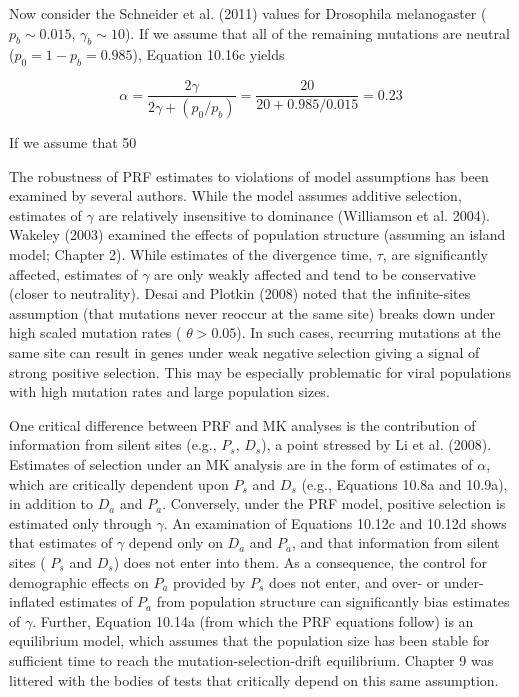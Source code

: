 \documentclass{article}
\begin{document}
Now consider the Schneider et al. (2011) values for Drosophila melanogaster ($p_b \sim 0.015$, $\gamma_b \sim 10$). If we assume that all of the remaining mutations are neutral ($p_0 = 1 - p_b = 0.985$), Equation 10.16c yields

\begin{equation}
\alpha=\frac{2\gamma}{2\gamma+\left(p_{0}/p_{b}\right)}=\frac{20}{20+0.985/0.015}=0.23
\end{equation}

If we assume that 50%

The robustness of PRF estimates to violations of model assumptions has been examined by several authors. While the model assumes additive selection, estimates of  $ \gamma $ are relatively insensitive to dominance (Williamson et al. 2004). Wakeley (2003) examined the effects of population structure (assuming an island model; Chapter 2). While estimates of the divergence time,  $ \tau $, are significantly affected, estimates of  $ \gamma $ are only weakly affected and tend to be conservative (closer to neutrality). Desai and Plotkin (2008) noted that the infinite-sites assumption (that mutations never reoccur at the same site) breaks down under high scaled mutation rates ( $ \theta > 0.05 $). In such cases, recurring mutations at the same site can result in genes under weak negative selection giving a signal of strong positive selection. This may be especially problematic for viral populations with high mutation rates and large population sizes.

One critical difference between PRF and MK analyses is the contribution of information from silent sites (e.g.,  $ P_s $,  $ D_s $), a point stressed by Li et al. (2008). Estimates of selection under an MK analysis are in the form of estimates of  $ \alpha $, which are critically dependent upon  $ P_s $ and  $ D_s $ (e.g., Equations 10.8a and 10.9a), in addition to  $ D_a $ and  $ P_a $. Conversely, under the PRF model, positive selection is estimated only through  $ \gamma $. An examination of Equations 10.12c and 10.12d shows that estimates of  $ \gamma $ depend only on  $ D_a $ and  $ P_a $, and that information from silent sites ( $ P_s $ and  $ D_s $) does not enter into them. As a consequence, the control for demographic effects on  $ P_a $ provided by  $ P_s $ does not enter, and over- or under-inflated estimates of  $ P_a $ from population structure can significantly bias estimates of  $ \gamma $. Further, Equation 10.14a (from which the PRF equations follow) is an equilibrium model, which assumes that the population size has been stable for sufficient time to reach the mutation-selection-drift equilibrium. Chapter 9 was littered with the bodies of tests that critically depend on this same assumption.
\end{document}
